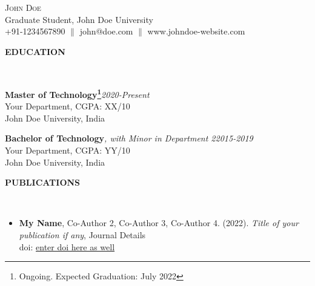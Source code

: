 \documentclass[9pt]{article}
\newenvironment{changemargin}[2]{%
  \begin{list}{}{%
    \setlength{\topsep}{0pt}%
    \setlength{\leftmargin}{#1}%
    \setlength{\rightmargin}{#2}%
    \setlength{\listparindent}{\parindent}%
    \setlength{\itemindent}{\parindent}%
    \setlength{\parsep}{\parskip}%
  }%
  \item[]}{\end{list}
}
\newcommand{\lineover}{
	\begin{changemargin}{-0.05in}{-0.05in}
		\vspace*{-8pt}
		\hrulefill \\
		\vspace*{-2pt}
	\end{changemargin}
}
\newcommand{\header}[1]{
	\begin{changemargin}{-0.7in}{-0.35in}
		\begin{large}
		\scshape{\textbf{#1}}\\
		\end{large}
  	\lineover
	\end{changemargin}
}
\newcommand{\contact}[3]{
	\begin{changemargin}{-0.5in}{-0.5in}
		\begin{center}
			{\Large \scshape {#1}}\\ \smallskip
      {{#2}}\\ \smallskip
			{{#3}}\\
		\end{center}
	\end{changemargin}
}
\newenvironment{body} {
	\vspace*{-16pt}
	\begin{changemargin}{-0.65in}{-0.5in}
  }	
	{\end{changemargin}
}
\newcommand{\school}[5]{
	\textbf{#1}\emph{#5}\hfill \emph{#2\\}
	#3\\ 
	#4\\
}
\begin{document}
\contact{John Doe}{Graduate Student, John Doe University}{+91-1234567890 $\|$ john@doe.com $\|$ www.johndoe-website.com}

\sffamily

\header{EDUCATION}
\begin{body}
	\vspace{14pt}
\school{Master of Technology\footnote{Ongoing. Expected Graduation: July 2022}}{2020-Present}{Your Department, CGPA: XX/10  }{John Doe University, India}{}
\vspace{14pt}
\school{Bachelor of Technology}{2015-2019}{Your Department, CGPA: YY/10}{John Doe University, India}{, with Minor in Department 2}


\end{body}
\medskip

\header{PUBLICATIONS} 

\begin{body}
	\vspace{14pt}
	

  	\begin{itemize} \itemsep -0pt
      \item  \textbf{My Name}, Co-Author 2, Co-Author 3, Co-Author 4. (2022). \textit{Title of your publication if any}, Journal Details \\ doi: \href{enter doi here}{enter doi here as well}
      
     
      
  	\end{itemize} 
\end{body}
\medskip
\end{document}
